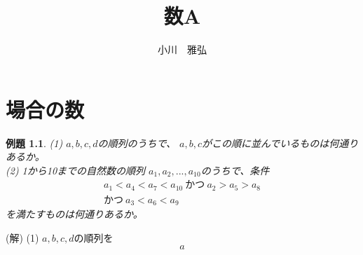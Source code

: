 \documentclass[a4paper,11pt,twocolumn]{jsbook}
\title{数A}
\author{小川　雅弘}
\newtheorem{example}{例題}[section]
\begin{document}
\maketitle

\chapter{場合の数}
\begin{screen}
\begin{example}
  (1) $a,b,c,d$の順列のうちで、 $a,b,c$がこの順に並んでいるものは何通りあるか。\\
  (2) 1から10までの自然数の順列 $a_1,a_2,...,a_{10}$のうちで、条件
  \begin{eqnarray}
    a_1<a_4 < a_7 < a_{10} \ \mbox{かつ} \ a_2 > a_5 > a_8 \\ \nonumber
    \mbox{かつ} \ a_3<a_6<a_9 \nonumber
  \end{eqnarray}
  を満たすものは何通りあるか。
\end{example}
\end{screen}
(解) (1) $a,b,c,d$の順列を
\begin{equation}
a
\end{equation}
\end{document}
